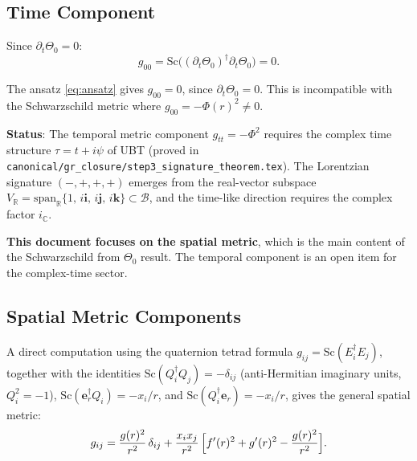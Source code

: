 \documentclass[11pt,a4paper]{article}
\theoremstyle{definition}
\theoremstyle{remark}
\begin{document}
\subsection{Time Component}

Since $\partial_t\Theta_0 = 0$:
\begin{equation}
  g_{00} = \mathrm{Sc}\bigl((\partial_t\Theta_0)^\dagger\partial_t\Theta_0\bigr) = 0.
  \label{eq:g00_zero}
\end{equation}

\begin{tcolorbox}[colback=red!10!white,colframe=red!75!black,
                  title={Known Limitation: Temporal Component}]
The ansatz \eqref{eq:ansatz} gives $g_{00} = 0$, since $\partial_t\Theta_0 = 0$.
This is incompatible with the Schwarzschild metric where $g_{00} = -\Phi(r)^2 \neq 0$.

\medskip
\textbf{Status}: The temporal metric component $g_{tt} = -\Phi^2$ requires the
complex time structure $\tau = t + i\psi$ of UBT
(proved in \texttt{canonical/gr\_closure/step3\_signature\_theorem.tex}).
The Lorentzian signature $(-,+,+,+)$ emerges from the real-vector subspace
$V_\mathbb{R} = \mathrm{span}_\mathbb{R}\{1,\,i\mathbf{i},\,i\mathbf{j},\,i\mathbf{k}\} \subset \mathcal{B}$,
and the time-like direction requires the complex factor $i_\mathbb{C}$.

\medskip
\textbf{This document focuses on the spatial metric}, which is the main
content of the Schwarzschild from $\Theta_0$ result.  The temporal component
is an open item for the complex-time sector.
\end{tcolorbox}

\subsection{Spatial Metric Components}

A direct computation using the quaternion tetrad formula
$g_{ij} = \mathrm{Sc}(E_i^\dagger E_j)$, together with the identities
$\mathrm{Sc}(Q_i^\dagger Q_j) = -\delta_{ij}$ (anti-Hermitian imaginary
units, $Q_i^2 = -1$), $\mathrm{Sc}(\boldsymbol{e}_r^\dagger Q_i) = -x_i/r$,
and $\mathrm{Sc}(Q_i^\dagger\boldsymbol{e}_r) = -x_i/r$, gives the general
spatial metric:
\begin{equation}
  g_{ij}
  = \frac{g(r)^2}{r^2}\,\delta_{ij}
  + \frac{x_i x_j}{r^2}\,\Bigl[f'(r)^2 + g'(r)^2 - \frac{g(r)^2}{r^2}\Bigr].
  \label{eq:g_ij_general}
\end{equation}
\end{document}
